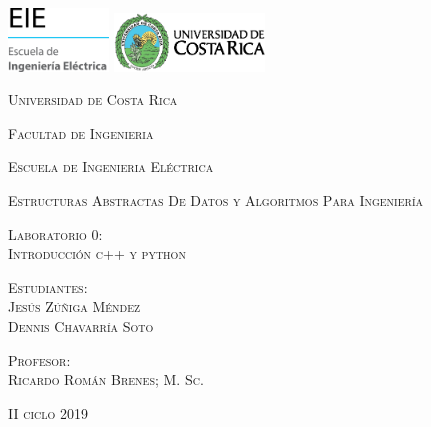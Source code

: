 \begin{titlepage}
		\bf
		\centering
		\includegraphics[width=0.20\textwidth]{images/EIE.png}			
		\hspace{7cm} 
		\includegraphics[width=0.30\textwidth]{images/UCR.png}	
		\par
		\vspace{2cm}			
		{\scshape\large Universidad de Costa Rica \par}
		\vspace{0.6cm}
		{\scshape\large Facultad de Ingenieria\par}
		\vspace{0.6cm}
		{\scshape\large Escuela de Ingenieria Eléctrica\par}
		\vspace{0.6cm}
		{\scshape\large Estructuras Abstractas De Datos y Algoritmos Para Ingeniería   \par}
		\vspace{1.5cm}		
		{\scshape\large Laboratorio 0:\\ Introducción c++ y python \par}
		\vspace{2.5cm}		
		{\scshape\large Estudiantes:\\ Jesús Zúñiga Méndez \\ Dennis Chavarría Soto  \par}
		\vspace{2.5cm}		
		{\scshape\large Profesor:\\ Ricardo Román Brenes; M. Sc. \par}
		\vspace{2.5cm}
		{\scshape\large II ciclo 2019 \par}
\end{titlepage}
